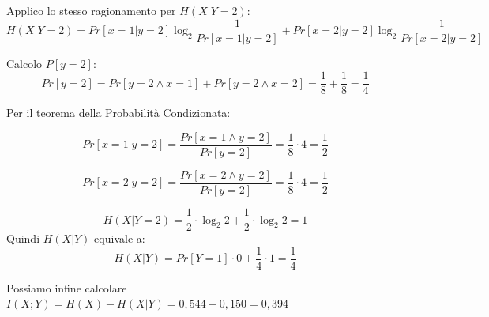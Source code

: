 Applico lo stesso ragionamento per $H(X|Y=2)$:
$$
H(X|Y=2) = Pr[x=1|y=2] \log_{2} \frac{1}{Pr[x=1|y=2]} + Pr[x=2|y=2] \log_{2} \frac{1}{Pr[x=2|y=2]}
$$

Calcolo $P[y=2]$:
$$
Pr[y=2] = Pr[y=2 \wedge x=1] + Pr[y=2 \wedge x=2] = \frac{1}{8} + \frac{1}{8} = \frac{1}{4} 
$$

Per il teorema della Probabilità Condizionata:\\
\begin{minipage}{0.50\textwidth}
	\begin{center}
		$$
		Pr[x=1|y=2] = \frac{Pr[x=1 \wedge y=2]}{Pr[y=2]} = \frac{1}{8} \cdot 4 = \frac{1}{2}
		$$
	\end{center}
\end{minipage}
\qquad
\begin{minipage}{0.50\textwidth}
	\begin{center}
		$$
		Pr[x=2|y=2] = \frac{Pr[x=2 \wedge y=2]}{Pr[y=2]} = \frac{1}{8} \cdot 4 = \frac{1}{2}
		$$
	\end{center}
\end{minipage}
$$
H(X|Y = 2) = \frac{1}{2}\cdot \log_{2} 2 + \frac{1}{2}\cdot \log_{2} 2 = 1
$$
Quindi $H(X|Y)$ equivale a:
$$
H(X|Y) = Pr[Y=1] \cdot 0 + \frac{1}{4} \cdot 1 = \frac{1}{4}
$$

Possiamo infine calcolare $I(X;Y) = H(X) - H(X|Y) = 0,544 - 0,150 = 0,394$


